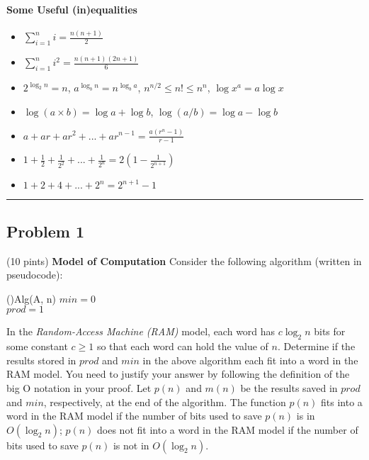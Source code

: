 \documentclass[12pt]{article}
\begin{document}
\paragraph{Some Useful (in)equalities}
\begin{itemize}
    \item $\sum_{i=1}^n i= \frac{n(n+1)}{2}$
    \item $\sum_{i=1}^ni^2 = \frac{n(n+1)(2n+1)}{6}$
    \item $2^{\log_2n}=n$, $a^{\log_bn}=n^{\log_ba}$, $n^{n/2}\leq n! \leq n^n$, $\log x^a = a\log x$
    \item $\log (a\times b) = \log a + \log b$, $\log(a/b) = \log a - \log b$
    \item $a + ar + ar^2 + ... + ar^{n-1} = \frac{a(r^n-1)}{r-1}$
    \item $1 + \frac{1}{2} + \frac{1}{2^2} + ... + \frac{1}{2^n} = 2(1-\frac{1}{2^{n+1}})$
    \item $1 + 2 + 4 + ... + 2^n = 2^{n+1}-1$
\end{itemize}

\hrule

\subsection*{Problem 1} (10 pints) {\bf Model of Computation} 
Consider the following algorithm (written in pseudocode):
\smallskip

\begin{algorithm}[H]
\Fn(){Alg(A, n)}{
\SetAlgoLined
\SetNoFillComment
\DontPrintSemicolon
$min = 0$ \\
$prod = 1$ \\
}
\end{algorithm}



\smallskip
In the {\em Random-Access Machine (RAM)} model, each word has $c \log_2 n$ bits for some constant $c \geq 1$ so that each word can hold the value of $n$. Determine if the results stored in $prod$ and $min$ in the above algorithm each fit into a word in the RAM model. You need to justify your answer by following the definition of the big O notation in your proof. Let $p(n)$ and $m(n)$ be the results saved in $prod$ and $min$, respectively, at the end of the algorithm. The function $p(n)$ fits into a word in the RAM model if the number of bits used to save $p(n)$ is in $O(\log_2 n)$; $p(n)$ does not fit into a word in the RAM model if the number of bits used to save $p(n)$ is not in $O(\log_2 n)$.
\end{document}
